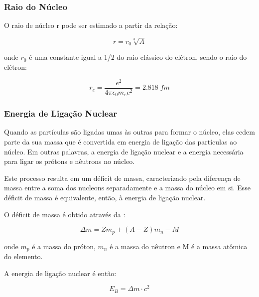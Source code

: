 \documentclass[11pt,a4paper]{article}
\begin{document}
            \subsubsection{Raio do Núcleo}

                O raio de núcleo r pode ser estimado a partir da relação:

                \begin{equation}
                    r = r_0 \sqrt[3]{A} 
                \end{equation}

                onde $r_0$ é uma constante igual a 1/2 do raio clássico do elétron, sendo o raio do elétron:

                \begin{equation}
                    r_e = \frac{e^2}{4 \pi \epsilon_0 m_e c^2} = 2.818 \; fm
                \end{equation}
            
            \subsubsection{Energia de Ligação Nuclear}

                Quando as partículas são ligadas umas às outras para formar o núcleo, elas cedem parte da sua massa que é convertida em energia de ligação das partículas ao núcleo. Em outras palavras, a energia de ligação nuclear e a energia necessária para ligar os prótons e nêutrons no núcleo. 

                Este processo resulta em um déficit de massa, caracterizado pela diferença de massa entre a soma dos nucleons separadamente e a massa do núcleo em si. Esse déficit de massa é equivalente, então, à energia de ligação nuclear.

                O déficit de massa é obtido através da :

                    \begin{equation}
                        \Delta  m = Zm_p + (A - Z)m_n - M
                    \end{equation}

                onde $m_p$ é a massa do próton, $m_n$ é a massa do nêutron e M é a massa atômica do elemento.

                A energia de ligação nuclear é então:

                    \begin{equation}
                        E_B = \Delta m \cdot c^2
                    \end{equation}
\end{document}
